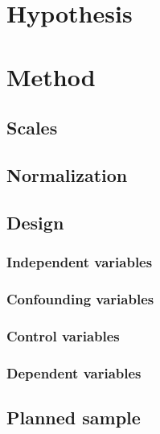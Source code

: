 \section{Hypothesis}
\label{sec:survey-hypothesis}

\section{Method}
\label{sec:survey-method}
\subsection{Scales}

\subsection{Normalization}

\subsection{Design}
\subsubsection{Independent variables}
\subsubsection{Confounding variables}
\subsubsection{Control variables}
\subsubsection{Dependent variables}

\subsection{Planned sample}
